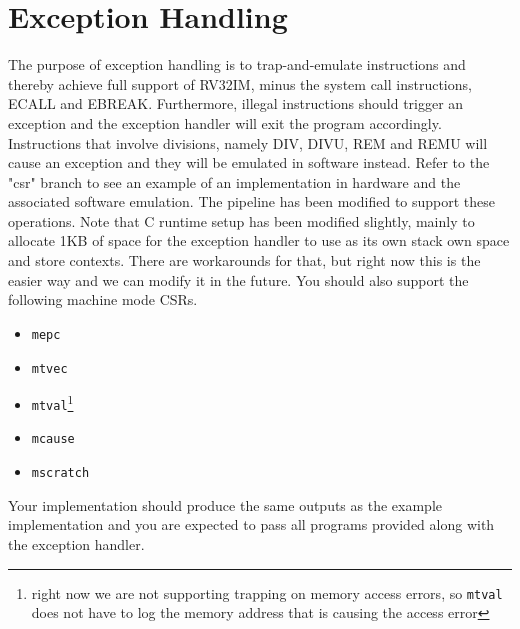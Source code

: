 \documentclass{article}
\begin{document}
\section{Exception Handling}
The purpose of exception handling is to trap-and-emulate instructions and thereby achieve full support of RV32IM, minus the system call instructions, ECALL and EBREAK. Furthermore, illegal instructions should trigger an exception and the exception handler will exit the program accordingly. Instructions that involve divisions, namely DIV, DIVU, REM and REMU will cause an exception and they will be emulated in software instead. Refer to the "csr" branch to see an example of an implementation in hardware and the associated software emulation. The pipeline has been modified to support these operations. Note that C runtime setup has been modified slightly, mainly to allocate 1KB of space for the exception handler to use as its own stack own space and store contexts. There are workarounds for that, but right now this is the easier way and we can modify it in the future.
You should also support the following machine mode CSRs.
\begin{itemize}
	\item \texttt{mepc}
	\item \texttt{mtvec}
	\item \texttt{mtval}\footnote{right now we are not supporting trapping on memory access errors, so \texttt{mtval} does not have to log the memory address that is causing the access error}
	\item \texttt{mcause}
	\item \texttt{mscratch}
\end{itemize}

Your implementation should produce the same outputs as the example implementation and you are expected to pass all programs provided along with the exception handler.


\end{document}
